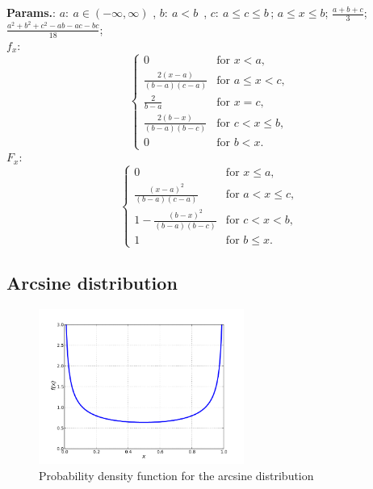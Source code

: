     {\color{darkblue} \textbf{Params.}:} {$a:~a\in (-\infty,\infty)$ ,  $b:~a<b\,$ ,  $c:~a\le c\le b\,$}; {$a \le x \le b \!$}; {$\frac{a+b+c}{3}$}; {$\frac{a^2+b^2+c^2-ab-ac-bc}{18}$};\hspace{0.5cm}\\{\color{darkblue} \textbf{$f_x$}:} {$$\begin{cases}
    0 & \text{for } x < a, \\
    \frac{2(x-a)}{(b-a)(c-a)} & \text{for } a \le x < c, \\[4pt]
    \frac{2}{b-a}             & \text{for } x = c, \\[4pt]
    \frac{2(b-x)}{(b-a)(b-c)} & \text{for } c < x \le b, \\[4pt]
    0 & \text{for } b < x.
 \end{cases}$$}{\color{darkblue} \textbf{$F_x$}:} {$$\begin{cases}
    0 & \text{for } x \leq a, \\[2pt]
    \frac{(x-a)^2}{(b-a)(c-a)} & \text{for } a < x \leq c, \\[4pt]
    1-\frac{(b-x)^2}{(b-a)(b-c)} & \text{for } c < x < b, \\[4pt]
    1 & \text{for } b \leq x.
  \end{cases}$$}



    
        
\subsection{Arcsine distribution}


    \begin{figure}[H]
        \centering
        \includegraphics[width=0.6\textwidth]{images/Arcsin density.png}
        \caption{Probability density function for the arcsine distribution}
    \end{figure}




